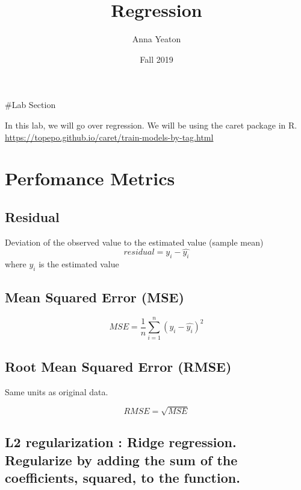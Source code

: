 \documentclass[11pt,]{article}
\title{Regression}
\author{Anna Yeaton}
\date{Fall 2019}
\begin{document}
\maketitle

\#Lab Section

In this lab, we will go over regression. We will be using the caret
package in R.
\url{https://topepo.github.io/caret/train-models-by-tag.html}

\hypertarget{perfomance-metrics}{%
\section{Perfomance Metrics}\label{perfomance-metrics}}

\hypertarget{residual}{%
\subsection{Residual}\label{residual}}

Deviation of the observed value to the estimated value (sample mean)
\[residual=y_i - \hat{y_i}\] where \(\hat{y_i}\) is the estimated value

\hypertarget{mean-squared-error-mse}{%
\subsection{Mean Squared Error (MSE)}\label{mean-squared-error-mse}}

\[MSE=\frac{1}{n}\sum_{i=1}^{n}(y_i - \hat{y_i})^2\]

\hypertarget{root-mean-squared-error-rmse}{%
\subsection{Root Mean Squared Error
(RMSE)}\label{root-mean-squared-error-rmse}}

Same units as original data.

\[RMSE=\sqrt{MSE}\]

\hypertarget{l2-regularization-ridge-regression.-regularize-by-adding-the-sum-of-the-coefficients-squared-to-the-function.}{%
\subsection{L2 regularization : Ridge regression. Regularize by adding
the sum of the coefficients, squared, to the
function.}\label{l2-regularization-ridge-regression.-regularize-by-adding-the-sum-of-the-coefficients-squared-to-the-function.}}
\end{document}
